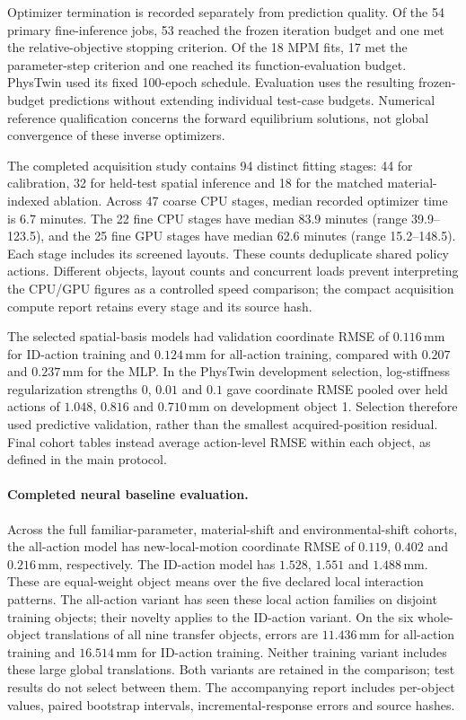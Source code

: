 \documentclass[10pt,twocolumn,letterpaper]{article}
\begin{document}
Optimizer termination is recorded separately from prediction quality. Of the 54 primary fine-inference jobs, 53 reached the frozen iteration budget and one met the relative-objective stopping criterion. Of the 18 MPM fits, 17 met the parameter-step criterion and one reached its function-evaluation budget. PhysTwin used its fixed 100-epoch schedule. Evaluation uses the resulting frozen-budget predictions without extending individual test-case budgets. Numerical reference qualification concerns the forward equilibrium solutions, not global convergence of these inverse optimizers.

The completed acquisition study contains 94 distinct fitting stages: 44 for calibration, 32 for held-test spatial inference and 18 for the matched material-indexed ablation. Across 47 coarse CPU stages, median recorded optimizer time is 6.7 minutes. The 22 fine CPU stages have median 83.9 minutes (range 39.9--123.5), and the 25 fine GPU stages have median 62.6 minutes (range 15.2--148.5). Each stage includes its screened layouts. These counts deduplicate shared policy actions. Different objects, layout counts and concurrent loads prevent interpreting the CPU/GPU figures as a controlled speed comparison; the compact acquisition compute report retains every stage and its source hash.

The selected spatial-basis models had validation coordinate RMSE of $0.116$\,mm for ID-action training and $0.124$\,mm for all-action training, compared with $0.207$ and $0.237$\,mm for the MLP. In the PhysTwin development selection, log-stiffness regularization strengths $0$, $0.01$ and $0.1$ gave coordinate RMSE pooled over held actions of $1.048$, $0.816$ and $0.710$\,mm on development object 1. Selection therefore used predictive validation, rather than the smallest acquired-position residual. Final cohort tables instead average action-level RMSE within each object, as defined in the main protocol.

\paragraph{Completed neural baseline evaluation.}
Across the full familiar-parameter, material-shift and environmental-shift cohorts, the all-action model has new-local-motion coordinate RMSE of $0.119$, $0.402$ and $0.216$\,mm, respectively. The ID-action model has $1.528$, $1.551$ and $1.488$\,mm. These are equal-weight object means over the five declared local interaction patterns. The all-action variant has seen these local action families on disjoint training objects; their novelty applies to the ID-action variant. On the six whole-object translations of all nine transfer objects, errors are $11.436$\,mm for all-action training and $16.514$\,mm for ID-action training. Neither training variant includes these large global translations. Both variants are retained in the comparison; test results do not select between them. The accompanying report includes per-object values, paired bootstrap intervals, incremental-response errors and source hashes.
\end{document}
